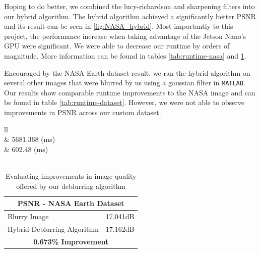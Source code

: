 \documentclass{article}
\begin{document}
Hoping to do better, we combined the lucy-richardson and sharpening filters into our hybrid algorithm. The hybrid algorithm achieved a significantly better PSNR and its result can be seen in \ref{fig:NASA_hybrid}.
Most importantly to this project, the performance increase when taking advantage of the Jetson Nano's GPU were significant. We were able to decrease our runtime by orders of magnitude. More information can be found in tables \ref{tab:runtime-nasa} and \ref{tab:psnr-nasa}.

Encouraged by the NASA Earth dataset result, we ran the hybrid algorithm on several other images that were blurred by us using a gaussian filter in \texttt{MATLAB}. Our results show comparable runtime improvements to the NASA image and can be found in table \ref{tab:runtime-dataset}. However, we were not able to observe improvements in PSNR across our custom dataset.

\begin{table}[htp]
\caption{Comparing runtime performance of algorithms optimized for CPU and GPU on the NASA Earth dataset}
\label{tab:runtime-nasa}
\begin{tabular}{ll}
\hline
{} \\ \hline
{} & 5681.368 (ms) \\ \hline
{} &  602.48 (ms) \\ \hline
{} \\ \hline

\end{tabular}
\end{table}

\begin{table}[htp]
\caption{Evaluating improvements in image quality offered by our deblurring algorithm}
\label{tab:psnr-nasa}
\begin{tabular}{ll}
\hline
\multicolumn{2}{c}{PSNR - NASA Earth Dataset} \\ \hline
\multicolumn{1}{l|}{Blurry Image} & 17.041dB \\ \hline
\multicolumn{1}{l|}{Hybrid Deblurring Algorithm} & 17.162dB \\ \hline
\multicolumn{2}{c}{\textbf{0.673\% Improvement}}
\end{tabular}
\end{table}
\end{document}
